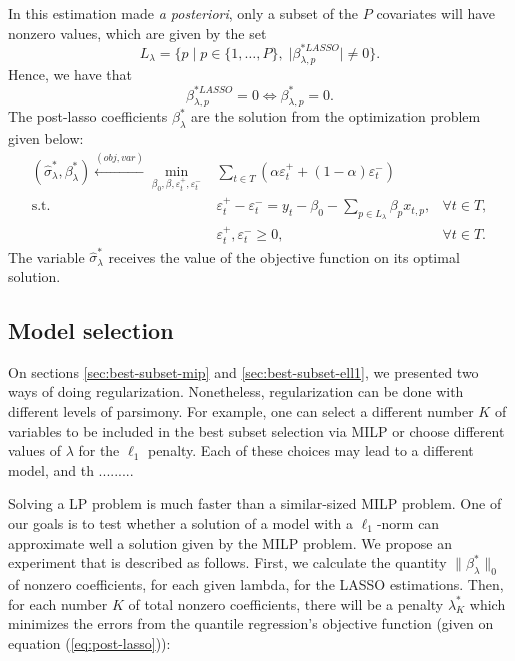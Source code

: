 In this estimation made \textit{a posteriori}, only a subset of the $P$ covariates will have nonzero values, which are given by the set 
\begin{equation*}
L_\lambda = \{ p \; | \; p \in \{ 1,\dots,P \}, \; |\beta^{*LASSO}_{\lambda,p}| \neq 0  \}.
\end{equation*}
Hence, we have that
$$\beta^{*LASSO}_{\lambda,p} = 0 \iff \beta^{*}_{\lambda,p} = 0.$$
The post-lasso coefficients $\beta_\lambda^*$ are the solution from the optimization problem given below:
\begin{equation}
\begin{aligned} (\hat{\sigma}_{\lambda}^{*},\beta_{\lambda}^{*})\overset{(obj,var)}{\longleftarrow} \min_{\beta_0,\beta,\varepsilon_{t}^{+},\varepsilon_{t}^{-}} & \sum_{t \in T}\left(\alpha\varepsilon_{t}^{+}+(1-\alpha)\varepsilon_{t}^{-}\right) \\
\mbox{s.t. } & \varepsilon_{t}^{+}-\varepsilon_{t}^{-}=y_{t} - \beta_0 - \sum_{p\in L_\lambda} \beta_p x_{t,p},& \forall t\in T,\\
& \varepsilon_t^+,\varepsilon_t^- \geq 0, & \forall t \in T.
\end{aligned}
\label{eq:post-lasso}
\end{equation}
The variable $\hat{\sigma}_{\lambda}^{*}$ receives the value of the objective function on its optimal solution.






\subsection{Model selection}

On sections \ref{sec:best-subset-mip} and \ref{sec:best-subset-ell1}, we presented two ways of doing regularization. Nonetheless, regularization can be done with different levels of parsimony. For example, one can select a different number $K$ of variables to be included in the best subset selection via MILP or choose different values of $\lambda$ for the $\ell_1$ penalty. Each of these choices may lead to a different model, and th ......... 


Solving a LP problem is much faster than a similar-sized MILP problem. One of our goals is to test whether a solution of a model with a $\ell_1$-norm can approximate well a solution given by the MILP problem. We propose an experiment that is described as follows. First, we calculate the quantity $\| \beta^*_\lambda \|_0$ of nonzero coefficients, for each given lambda, for the LASSO estimations.
Then, for each number $K$ of total nonzero coefficients, there will be a penalty $\lambda^*_K$ which minimizes the errors from the quantile regression's objective function (given on equation (\ref{eq:post-lasso})): 

